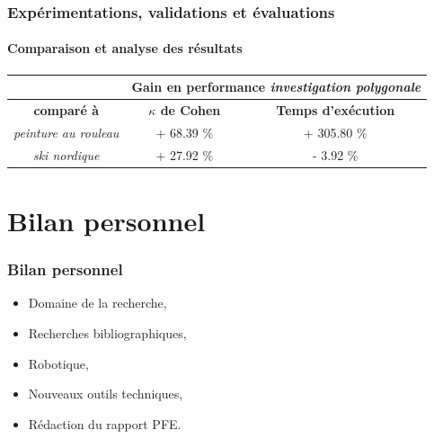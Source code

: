 \documentclass{beamer}
\begin{document}
			\begin{frame}
				\frametitle{Expérimentations, validations et évaluations}
				\framesubtitle{Comparaison et analyse des résultats}
				\begin{table}[H]
					\centering
					\begin{tabular}{|c|c|c|}
						\hline
						& \multicolumn{2}{c|}{\textbf{Gain en performance \textit{investigation polygonale}}} \\
						\hline
						\textbf{comparé à} & \textbf{$\kappa$ de Cohen} & \textbf{Temps d'exécution} \\
						\hline
						\textit{peinture au rouleau} & + 68.39 \% & + 305.80 \% \\
						\hline
						\textit{ski nordique} & + 27.92 \% & - 3.92 \% \\
						\hline
					\end{tabular}
				\end{table}
			\end{frame}
	\section{Bilan personnel}
		\begin{frame}
			\frametitle{Bilan personnel}
			\begin{itemize}
				\item Domaine de la recherche,
				\item Recherches bibliographiques,
				\item Robotique,
				\item Nouveaux outils techniques,
				\item Rédaction du rapport PFE.
			\end{itemize}
		\end{frame}
\end{document}
